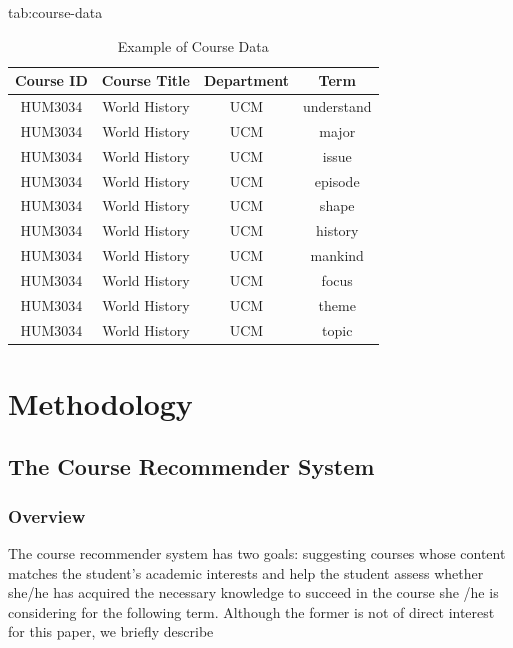 \documentclass[pmlr]{jmlr}%
\begin{document}
\begin{table}[hbtp]
	\floatconts
	{tab:course-data}
	{\caption{Example of Course Data}}	
	{\begin{tabular}{cccc}
			\toprule
			\bfseries Course ID &\bfseries Course Title &\bfseries Department &\bfseries Term\\
			\midrule
			HUM3034 & World History & UCM & understand\\
			HUM3034 & World History & UCM & major\\
			HUM3034 & World History & UCM & issue\\
			HUM3034 & World History & UCM & episode\\
			HUM3034 & World History & UCM & shape\\
			\addlinespace
			HUM3034 & World History & UCM & history\\
			HUM3034 & World History & UCM & mankind\\
			HUM3034 & World History & UCM & focus\\
			HUM3034 & World History & UCM & theme\\
			HUM3034 & World History & UCM & topic\\
			\bottomrule
	\end{tabular}}	
\end{table}

\section{Methodology}
\label{sec:methodology}

\subsection{The Course Recommender System}
\label{sec:crs}

\subsubsection{Overview}
\label{sec:overview}
The course recommender system has two goals: suggesting courses whose content matches the student's academic interests and help the student assess whether she/he has acquired the necessary knowledge to succeed in the course she /he is considering for the following term. Although the former is not of direct interest for this paper, we briefly describe 
\end{document}
